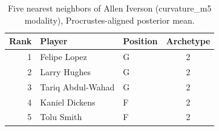 \begin{table}[htbp]
  \centering\small
  \begin{tabular}{rllc}
    \toprule
    Rank & Player & Position & Archetype \\
    \midrule
    1 & Felipe Lopez & G & 2 \\
    2 & Larry Hughes & G & 2 \\
    3 & Tariq Abdul-Wahad & G & 2 \\
    4 & Kaniel Dickens & F & 2 \\
    5 & Tolu Smith & F & 2 \\
    \bottomrule
  \end{tabular}
  \caption{Five nearest neighbors of Allen Iverson (curvature_m5 modality), Procrustes-aligned posterior mean.}
  \label{tab:Allen_Iverson_neighbors_curvature_m5}
\end{table}

